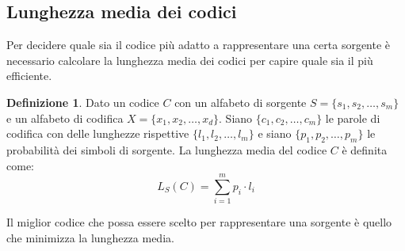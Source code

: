 \documentclass{article}
\theoremstyle{definition}
\newtheorem{definizione}{Definizione}[section]
\numberwithin{equation}{section}
\begin{document}
\subsection{Lunghezza media dei codici}
Per decidere quale sia il codice più adatto a rappresentare una certa sorgente è necessario calcolare la lunghezza media dei codici per capire quale sia il più efficiente.
\begin{definizione}
    Dato un codice $C$ con un alfabeto di sorgente $S=\{s_1,s_2,\ldots,s_m\}$ e un alfabeto di codifica $X=\{x_1,x_2,\ldots,x_d\}$. Siano $\{c_1,c_2,\ldots,c_m\}$ le parole di codifica con delle lunghezze rispettive $\{l_1,l_2,\ldots,l_m\}$ e siano $\{p_1,p_2,\ldots,p_m\}$ le probabilità dei simboli di sorgente. La lunghezza media del codice $C$ è definita come:
    \[
        L_S(C) = \sum_{i=1}^m p_i \cdot l_i
    \]
\end{definizione}
Il miglior codice che possa essere scelto per rappresentare una sorgente è quello che minimizza la lunghezza media.
\end{document}
